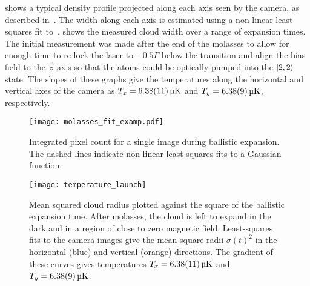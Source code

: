 \par\noindent
{} shows a typical density
profile projected along each axis seen by the camera,
as described in~. The width along each
axis is estimated using a non-linear least squares fit
to~.
 shows the measured cloud width
over a range of expansion times. The
initial measurement was made  after the end
of the molasses to allow for enough time to re-lock the laser to
\(-0.5\Gamma\) below the  transition and align the bias
field to the \(\vec{z}\) axis so that the atoms could be optically
pumped into the \(\ket{2,2}\) state. 
The slopes of these graphs give the temperatures along the horizontal and vertical axes of the
camera as \(T_x = \sivalue{6.38 \pm 0.11}{\micro\kelvin}\) and \(T_y =
\sivalue{6.38 \pm 0.09}{\micro\kelvin}\), respectively.  
\begin{figure}[htpb]
  \centering
  \texttt{[image: molasses\_fit\_examp.pdf]}
  \caption[Integrated pixel counts during ballistic expansion.]{Integrated pixel count for a single image during ballistic
  expansion. The dashed lines indicate non-linear least squares fits
to a Gaussian function.}
  \label{fig:molasses_fit_examp}
\end{figure}
\begin{figure}[!htbp]
    \centering
    \texttt{[image: temperature\_launch]}
    \caption[Temperature measurement using ballistic expansion]{Mean
      squared cloud radius plotted against the square of the ballistic
      expansion time. After
  molasses, the cloud is left to expand in the dark and in a region of
  close to zero magnetic field. Least-squares fits to the camera
  images give the mean-square radii $\sigma(t)^2$ in the horizontal
  (blue) and vertical (orange) directions. 
The gradient of these curves gives temperatures \(T_x = \sivalue{6.38 \pm0.11}{\micro\kelvin}\) and \(T_y =
\sivalue{6.38\pm0.09}{\micro\kelvin}\).}
    \label{fig:molasses_temperature}
\end{figure}

